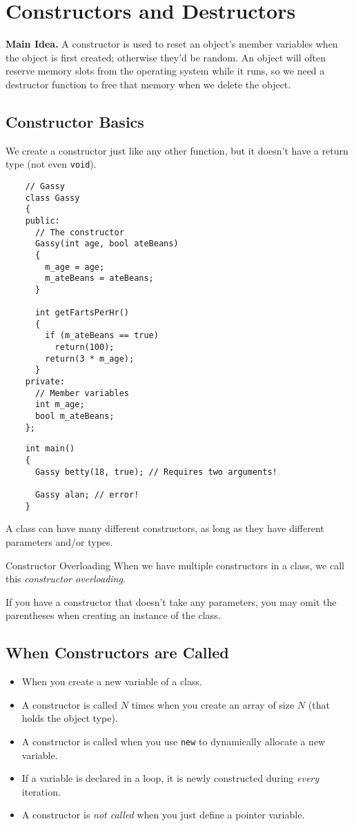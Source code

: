\documentclass[class=article, crop=false]{standalone}
\begin{document}
  \section{Constructors and Destructors}
  \textbf{Main Idea.} A constructor is used to reset an object's member variables when the object is first created; otherwise they'd be random. An object will often reserve memory slots from the operating system while it runs, so we need a destructor function to free that memory when we delete the object.
  \subsection{Constructor Basics}
  We create a constructor just like any other function, but it doesn't have a return type (not even \texttt{void}).
  \begin{lstlisting}
    // Gassy
    class Gassy
    {
    public:
      // The constructor
      Gassy(int age, bool ateBeans)
      {
        m_age = age;
        m_ateBeans = ateBeans;
      }

      int getFartsPerHr()
      {
        if (m_ateBeans == true)
          return(100);
        return(3 * m_age);
      }
    private:
      // Member variables
      int m_age;
      bool m_ateBeans;
    };
  \end{lstlisting}
  \begin{lstlisting}
    int main()
    {
      Gassy betty(18, true); // Requires two arguments!

      Gassy alan; // error!
    }
  \end{lstlisting}
  A class can have many different constructors, as long as they have different parameters and/or types. 
  \begin{definition}{Constructor Overloading}
    When we have multiple constructors in a class, we call this \emph{constructor overloading}.
  \end{definition}
  \begin{note}{}
    If you have a constructor that doesn't take any parameters, you may omit the parentheses when creating an instance of the class.
  \end{note}
  \subsection{When Constructors are Called}
  \begin{itemize}
    \item When you create a new variable of a class.
    \item A constructor is called $N$ times when you create an array of size $N$ (that holds the object type).
    \item A constructor is called when you use \texttt{new} to dynamically allocate a new variable.
    \item If a variable is declared in a loop, it is newly constructed during \emph{every} iteration.
    \item A constructor is \emph{not called} when you just define a pointer variable.
  \end{itemize}
\end{document}
